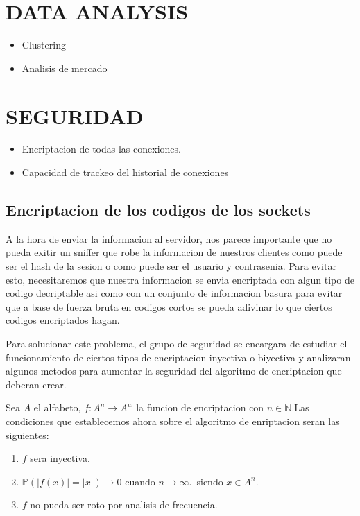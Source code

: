 \documentclass{article}
\theoremstyle{definition}
\begin{document}
\section{DATA ANALYSIS}

\begin{itemize}
    \item Clustering
    \item Analisis de mercado
\end{itemize}

\section{SEGURIDAD}

\begin{itemize}
    \item Encriptacion de todas las conexiones.
    \item Capacidad de trackeo del historial de conexiones
\end{itemize}

\subsection{Encriptacion de los codigos de los sockets}

A la hora de enviar la informacion al servidor, nos parece importante que no pueda exitir un sniffer que robe la informacion de nuestros clientes como puede ser el hash de la sesion o como puede ser el usuario y contrasenia. Para evitar esto, necesitaremos que nuestra informacion se envia encriptada con algun tipo de codigo decriptable asi como con un conjunto de informacion basura para evitar que a base de fuerza bruta en codigos cortos se pueda adivinar lo que ciertos codigos encriptados hagan.

Para solucionar este problema, el grupo de seguridad se encargara de estudiar el funcionamiento de ciertos tipos de encriptacion inyectiva o biyectiva y analizaran algunos metodos para aumentar la seguridad del algoritmo de encriptacion que deberan crear.

Sea $A$ el alfabeto, $f : A^n \to A^w$ la funcion de encriptacion con $n \in \mathbb{N}$.Las condiciones que establecemos ahora sobre el algoritmo de enriptacion seran las siguientes:

\begin{enumerate}
    \item $f$ sera inyectiva.
    \item $\mathbb{P}\left(|f(x)|=|x|\right) \to 0$ cuando $n \to \infty$.\, siendo $x \in A^n$.
    \item $f$ no pueda ser roto por analisis de frecuencia.
\end{enumerate}
\end{document}
